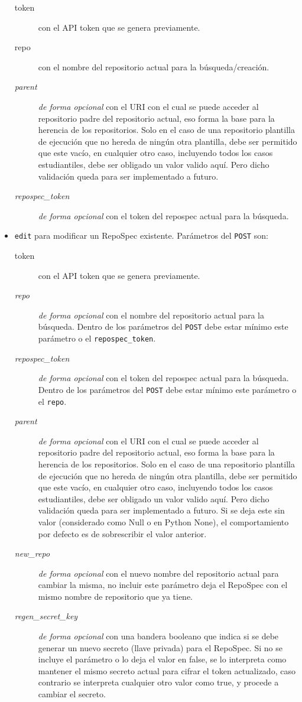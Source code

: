 \begin{itemize}
    \begin{description}
    	\item[token] con el API token que se genera previamente.
        \item[repo] con el nombre del repositorio actual para la búsqueda/creación.
        \item[\textit{parent}] \textit{de forma opcional} con el URI con el cual se puede acceder al repositorio padre del repositorio actual, eso forma la base para la herencia de los repositorios. Solo en el caso de una repositorio plantilla de ejecución que no hereda de ningún otra plantilla, debe ser permitido que este vacío, en cualquier otro caso, incluyendo todos los casos estudiantiles, debe ser obligado un valor valido aquí. Pero dicho validación queda para ser implementado a futuro.
        \item[\textit{repospec\_token}] \textit{de forma opcional} con el token del repospec actual para la búsqueda.
    \end{description}
    \item \texttt{edit} para modificar un RepoSpec existente. Parámetros del \texttt{POST} son:
    \begin{description}
    	\item[token] con el API token que se genera previamente.
        \item[\textit{repo}] \textit{de forma opcional} con el nombre del repositorio actual para la búsqueda. Dentro de los parámetros del \texttt{POST} debe estar mínimo este parámetro o el \texttt{repospec\_token}.
        \item[\textit{repospec\_token}] \textit{de forma opcional} con el token del repospec actual para la búsqueda. Dentro de los parámetros del \texttt{POST} debe estar mínimo este parámetro o el \texttt{repo}.
        \item[\textit{parent}] \textit{de forma opcional} con el URI con el cual se puede acceder al repositorio padre del repositorio actual, eso forma la base para la herencia de los repositorios. Solo en el caso de una repositorio plantilla de ejecución que no hereda de ningún otra plantilla, debe ser permitido que este vacío, en cualquier otro caso, incluyendo todos los casos estudiantiles, debe ser obligado un valor valido aquí. Pero dicho validación queda para ser implementado a futuro. Si se deja este sin valor (considerado como Null o en Python None), el comportamiento por defecto es de sobrescribir el valor anterior.
        \item[\textit{new\_repo}] \textit{de forma opcional} con el nuevo nombre del repositorio actual para cambiar la misma, no incluir este parámetro deja el RepoSpec con el mismo nombre de repositorio que ya tiene.
        \item[\textit{regen\_secret\_key}] \textit{de forma opcional} con una bandera booleano que indica si se debe generar un nuevo secreto (llave privada) para el RepoSpec. Si no se incluye el parámetro o lo deja el valor en false, se lo interpreta como mantener el mismo secreto actual para cifrar el token actualizado, caso contrario se interpreta cualquier otro valor como true, y procede a cambiar el secreto. 
    \end{description}
\end{itemize}
